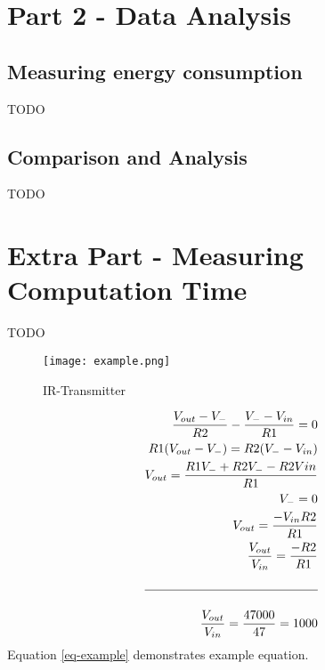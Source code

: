 \documentclass{article}	%
\begin{document}
\section{Part 2 - Data Analysis}
\subsection{Measuring energy consumption}
TODO

\subsection{Comparison and Analysis}
TODO

\section{Extra Part - Measuring Computation Time}
TODO

\begin{figure}[!hbt]
\begin{center}
\texttt{[image: example.png]}
\end{center}
\caption{IR-Transmitter}
\label{FIG-TRANSMITTER}
\end{figure}

\begin{equation}
\begin{split}
\frac{V_{out}-V_-}{R2}-\frac{V_--V_{in}}{R1}=0 \\
R1(V_{out}-V_-)=R2(V_--V_{in}) \\
V_{out}=\frac{R1V_-+R2V_--R2V{in}}{R1} \\
V_-=0 \\
V_{out}=\frac{-V_{in}R2}{R1} \\
\frac{V_{out}}{V_{in}}=\frac{-R2}{R1} \\ \\
\hline \\
\frac{V_{out}}{V_{in}}=\frac{47000}{47}=1000 \\
\end{split}
\label{eq-example}
\end{equation}
Equation \ref{eq-example} demonstrates example equation.


\end{document}
